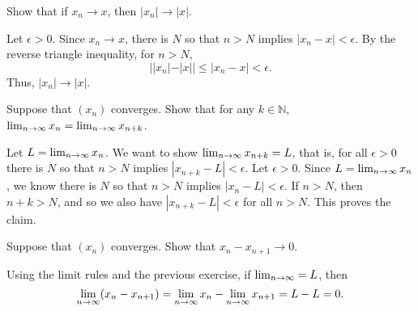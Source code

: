\documentclass[11pt,dvipsnames]{book}
\numberwithin{equation}{section} %
\numberwithin{figure}{section} %
\numberwithin{table}{section} %
\begin{document}
 
 
\begin{exercise}
Show that if $x_n\rightarrow x$, then $|x_n|\rightarrow |x|$. 

\begin{solution}
Let $\epsilon>0$. Since $x_n\rightarrow x$, there is $N$ so that $n> N$ implies $|x_{n}-x|<\epsilon$. By the reverse triangle inequality, for $n> N$,
\[
||x_{n}|-|x||
\leq |x_{n}-x|<\epsilon.
\]
Thus, $|x_n|\rightarrow |x|$.
\end{solution}

\end{exercise}

\begin{exercise}\label{68}
Suppose that $(x_{n})$ converges. Show that  for any $k\in\mathbb{N}$, $\lim_{n\rightarrow\infty} x_{n}= \lim_{n\rightarrow\infty} x_{n+k}$. 

\begin{solution}
Let $L=\lim_{n\rightarrow\infty} x_{n}$. We want to show $\lim_{n\rightarrow\infty} x_{n+k}=L$, that is, for all $\epsilon>0$ there is $N$ so that $n> N$ implies $|x_{n+k}-L|<\epsilon$. Let $\epsilon>0$. Since $L=\lim_{n\rightarrow\infty} x_{n}$, we know there is $N$ so that $n> N$ implies $|x_{n}-L|<\epsilon$. If $n> N$, then $n+k>N$, and so we also have $|x_{n+k}-L|<\epsilon$ for all $n> N$. This proves the claim.
\end{solution}
\end{exercise}




\begin{exercise}
Suppose that $(x_{n})$ converges. Show that $x_{n}-x_{n+1}\rightarrow 0$. 

\begin{solution}
Using the limit rules and the previous exercise, if $\lim_{n\rightarrow\infty} =L$, then
\[
\lim_{n\rightarrow\infty}(x_{n}-x_{n+1})
=\lim_{n\rightarrow\infty} x_n - \lim_{n\rightarrow\infty} x_{n+1} = L-L=0.
\]
\end{solution}
\end{exercise}
%
%
%
\end{document}
